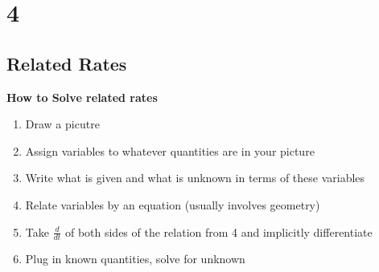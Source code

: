 \documentclass[11pt]{article}
\theoremstyle{plain}
\theoremstyle{definition}
\begin{document}
\section{4}
\subsection{Related Rates}
\textbf{How to Solve related rates}
\begin{enumerate}
	\item Draw a picutre
	\item Assign variables to whatever quantities are in your picture
	\item Write what is given and what is unknown in terms of these variables
	\item Relate variables by an equation (usually involves geometry)
	\item Take $\frac{d}{dt}$ of both sides of the relation from 4 and implicitly differentiate
	\item Plug in known quantities, solve for unknown
\end{enumerate}
\end{document}
